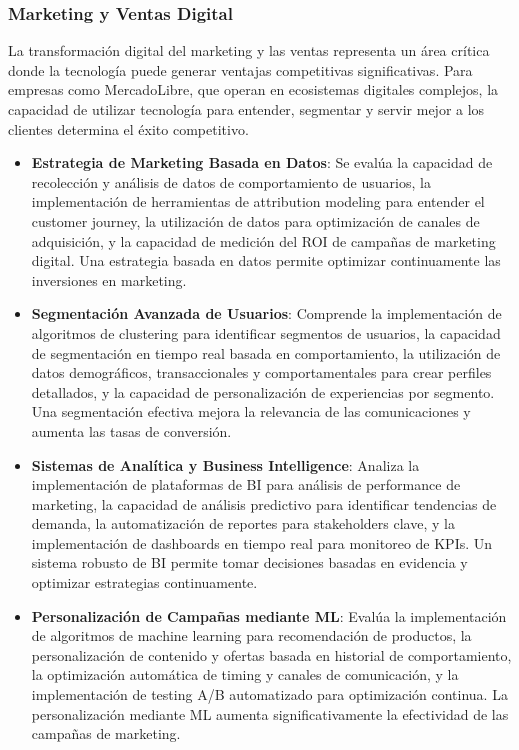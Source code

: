 \subsubsection{Marketing y Ventas Digital}

La transformación digital del marketing y las ventas representa un área crítica donde la tecnología puede generar ventajas competitivas significativas. Para empresas como MercadoLibre, que operan en ecosistemas digitales complejos, la capacidad de utilizar tecnología para entender, segmentar y servir mejor a los clientes determina el éxito competitivo.

\begin{itemize}
\item \textbf{Estrategia de Marketing Basada en Datos}: Se evalúa la capacidad de recolección y análisis de datos de comportamiento de usuarios, la implementación de herramientas de attribution modeling para entender el customer journey, la utilización de datos para optimización de canales de adquisición, y la capacidad de medición del ROI de campañas de marketing digital. Una estrategia basada en datos permite optimizar continuamente las inversiones en marketing.

\item \textbf{Segmentación Avanzada de Usuarios}: Comprende la implementación de algoritmos de clustering para identificar segmentos de usuarios, la capacidad de segmentación en tiempo real basada en comportamiento, la utilización de datos demográficos, transaccionales y comportamentales para crear perfiles detallados, y la capacidad de personalización de experiencias por segmento. Una segmentación efectiva mejora la relevancia de las comunicaciones y aumenta las tasas de conversión.

\item \textbf{Sistemas de Analítica y Business Intelligence}: Analiza la implementación de plataformas de BI para análisis de performance de marketing, la capacidad de análisis predictivo para identificar tendencias de demanda, la automatización de reportes para stakeholders clave, y la implementación de dashboards en tiempo real para monitoreo de KPIs. Un sistema robusto de BI permite tomar decisiones basadas en evidencia y optimizar estrategias continuamente.

\item \textbf{Personalización de Campañas mediante ML}: Evalúa la implementación de algoritmos de machine learning para recomendación de productos, la personalización de contenido y ofertas basada en historial de comportamiento, la optimización automática de timing y canales de comunicación, y la implementación de testing A/B automatizado para optimización continua. La personalización mediante ML aumenta significativamente la efectividad de las campañas de marketing.
\end{itemize}

